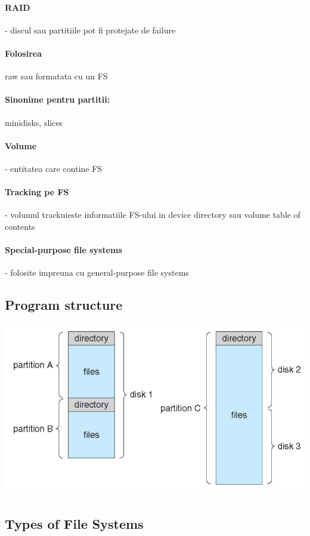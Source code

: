 \documentclass{article}
\begin{document}
\paragraph*{RAID} - discul sau partitiile pot fi protejate de failure
\paragraph*{Folosirea} raw sau formatata cu un FS
\paragraph*{Sinonime pentru partitii:} minidisks, slices
\paragraph*{Volume} - entitatea care contine FS
\paragraph*{Tracking pe FS} - volumul trackuieste informatiile FS-ului in device directory sau volume table of contents
\paragraph*{Special-purpose file systems} - folosite impreuna cu general-purpose file systems

\subsection*{Program structure}
\begin{center}
    \includegraphics[scale=0.4]{41-fsorg.png}
\end{center}

\subsection*{Types of File Systems}
\end{document}
